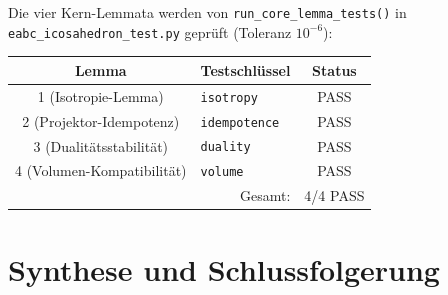 \documentclass[11pt,a4paper]{article}
\begin{document}
Die vier Kern-Lemmata werden von \texttt{run\_core\_lemma\_tests()} in
\texttt{eabc\_icosahedron\_test.py} geprüft (Toleranz $10^{-6}$):

\begin{center}
\begin{tabular}{clc}
\hline
Lemma & Testschlüssel & Status \\
\hline
1 (Isotropie-Lemma)        & \texttt{isotropy}     & PASS \\
2 (Projektor-Idempotenz)   & \texttt{idempotence}  & PASS \\
3 (Dualitätsstabilität)    & \texttt{duality}      & PASS \\
4 (Volumen-Kompatibilität) & \texttt{volume}       & PASS \\
\hline
\multicolumn{2}{r}{Gesamt:} & 4/4 PASS \\
\end{tabular}
\end{center}

\section*{Synthese und Schlussfolgerung}
\label{sec:conclusion}
\end{document}
